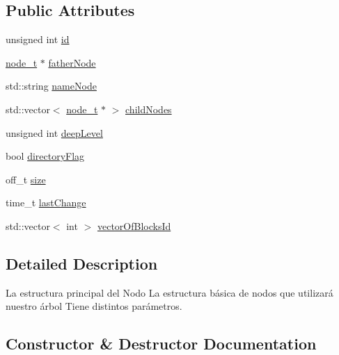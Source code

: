 \subsection*{Public Attributes}
\begin{DoxyCompactItemize}
\item 
unsigned int \hyperlink{structnode__t_a3d32f150f8a692d43e545b8b53eb856e}{id}
\item 
\hyperlink{structnode__t}{node\+\_\+t} $\ast$ \hyperlink{structnode__t_a677649fc87677fd268566458fabf99db}{father\+Node}
\item 
std\+::string \hyperlink{structnode__t_a202c45b136037819d05bdd73728de399}{name\+Node}
\item 
std\+::vector$<$ \hyperlink{structnode__t}{node\+\_\+t} $\ast$ $>$ \hyperlink{structnode__t_a7087dffd0a04067c1a713e9c35df15cc}{child\+Nodes}
\item 
unsigned int \hyperlink{structnode__t_ae2fe752b52c2d4782ebbb6a9a5f28d49}{deep\+Level}
\item 
bool \hyperlink{structnode__t_a86637ae4679009b157317c3fa701e148}{directory\+Flag}
\item 
off\+\_\+t \hyperlink{structnode__t_a692153fd99c77b0a2a2e06571abd41f2}{size}
\item 
time\+\_\+t \hyperlink{structnode__t_ad505eaabfc4f22a4a982c80403e26f13}{last\+Change}
\item 
std\+::vector$<$ int $>$ \hyperlink{structnode__t_aabfde8107272be30b155bcff86a486de}{vector\+Of\+Blocks\+Id}
\end{DoxyCompactItemize}


\subsection{Detailed Description}
La estructura principal del Nodo La estructura básica de nodos que utilizará nuestro árbol Tiene distintos parámetros. 

\subsection{Constructor \& Destructor Documentation}
\mbox{\label{structnode__t_a91cf3f91cff0e714a148090202a9cb47}} 
